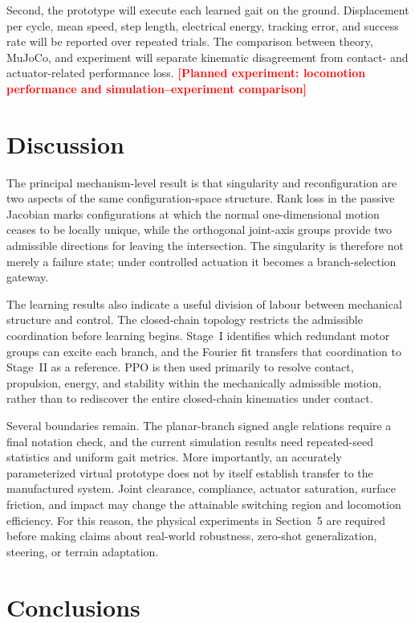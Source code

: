 ﻿\documentclass[a4paper,fleqn]{cas-sc}
\newcommand{\missing}[1]{\textcolor{red}{\textbf{[#1]}}}
\begin{document}
Second, the prototype will execute each learned gait on the ground.
Displacement per cycle, mean speed, step length, electrical energy, tracking
error, and success rate will be reported over repeated trials. The comparison
between theory, MuJoCo, and experiment will separate kinematic disagreement
from contact- and actuator-related performance loss.
\missing{Planned experiment: locomotion performance and
simulation--experiment comparison}

\section{Discussion}

The principal mechanism-level result is that singularity and reconfiguration
are two aspects of the same configuration-space structure. Rank loss in the
passive Jacobian marks configurations at which the normal one-dimensional
motion ceases to be locally unique, while the orthogonal joint-axis groups
provide two admissible directions for leaving the intersection. The
singularity is therefore not merely a failure state; under controlled
actuation it becomes a branch-selection gateway.

The learning results also indicate a useful division of labour between
mechanical structure and control. The closed-chain topology restricts the
admissible coordination before learning begins. Stage~I identifies which
redundant motor groups can excite each branch, and the Fourier fit transfers
that coordination to Stage~II as a reference. PPO is then used primarily to
resolve contact, propulsion, energy, and stability within the mechanically
admissible motion, rather than to rediscover the entire closed-chain
kinematics under contact.

Several boundaries remain. The planar-branch signed angle relations require a
final notation check, and the current simulation results need repeated-seed
statistics and uniform gait metrics. More importantly, an accurately
parameterized virtual prototype does not by itself establish transfer to the
manufactured system. Joint clearance, compliance, actuator saturation,
surface friction, and impact may change the attainable switching region and
locomotion efficiency. For this reason, the physical experiments in
Section~5 are required before making claims about real-world robustness,
zero-shot generalization, steering, or terrain adaptation.

\section{Conclusions}
\end{document}
